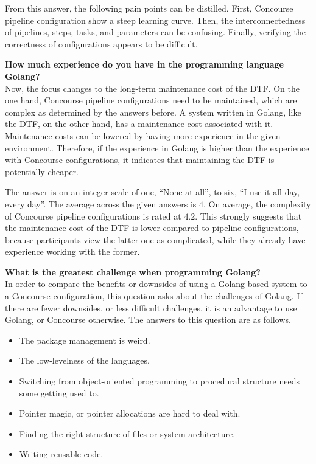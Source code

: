 From this answer, the following pain points can be distilled.
First, Concourse pipeline configuration show a steep learning curve.
Then, the interconnectedness of pipelines, steps, tasks, and parameters can be confusing.
Finally, verifying the correctness of configurations appears to be difficult.

\textbf{How much experience do you have in the programming language Golang?}\\
Now, the focus changes to the long-term maintenance cost of the DTF.
On the one hand, Concourse pipeline configurations need to be maintained, which are complex as determined by the answers before.
A system written in Golang, like the DTF, on the other hand, has a maintenance cost associated with it.
Maintenance costs can be lowered by having more experience in the given environment.
Therefore, if the experience in Golang is higher than the experience with Concourse configurations, it indicates that maintaining the DTF is potentially cheaper.

The answer is on an integer scale of one, ``None at all'', to six, ``I use it all day, every day''.
The average across the given answers is $4$.
On average, the complexity of Concourse pipeline configurations is rated at $4.2$.
This strongly suggests that the maintenance cost of the DTF is lower compared to pipeline configurations, because participants view the latter one as complicated, while they already have experience working with the former.

\textbf{What is the greatest challenge when programming Golang?}\\
In order to compare the benefits or downsides of using a Golang based system to a Concourse configuration, this question asks about the challenges of Golang.
If there are fewer downsides, or less difficult challenges, it is an advantage to use Golang, or Concourse otherwise.
The answers to this question are as follows.

\begin{itemize}
    \item The package management is weird.
    \item The low-levelness of the languages.
    \item Switching from object-oriented programming to procedural structure needs some getting used to.
    \item Pointer magic, or pointer allocations are hard to deal with.
    \item Finding the right structure of files or system architecture.
    \item Writing reusable code.
\end{itemize}


